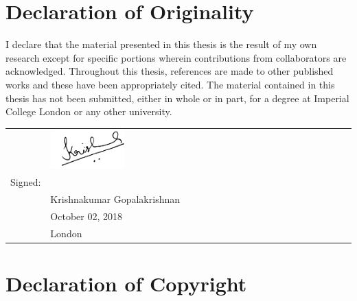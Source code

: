 
\graphicspath{{chapters/frontmatter/figures/}}

\chapter*{Declaration of Originality \hfill}

\vspace*{-1.0cm}

I declare  that the material presented  in this thesis  is the result of  my own
research except  for specific portions wherein  contributions from collaborators
are acknowledged. Throughout this thesis, references are made to other published
works and  these have been appropriately  cited. The material contained  in this
thesis has  not been  submitted, either  in whole or  in part,  for a  degree at
Imperial College London or any other university.\\[-3em]

\begin{flushright}
        \begin{tabular}{@{}p{.4in}p{2.1in}@{}}
            & \includegraphics[angle=-5,width=0.25\textwidth]{black_ink_sign_from_jpg}\\[-2em]
            Signed: & \hrulefill \\
                    & Krishnakumar Gopalakrishnan \\
                    & October 02, 2018\\
                    & London \\
        \end{tabular}
\end{flushright}

{\let\clearpage\relax \chapter*{Declaration of Copyright\hfill}}

\vspace*{-1cm}

